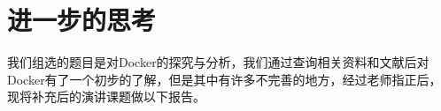 \documentclass{article}
\begin{document}




\section{进一步的思考}
我们组选的题目是对Docker的探究与分析，我们通过查询相关资料和文献后对Docker有了一个初步的了解，但是其中有许多不完善的地方，经过老师指正后，现将补充后的演讲课题做以下报告。
\end{document}
